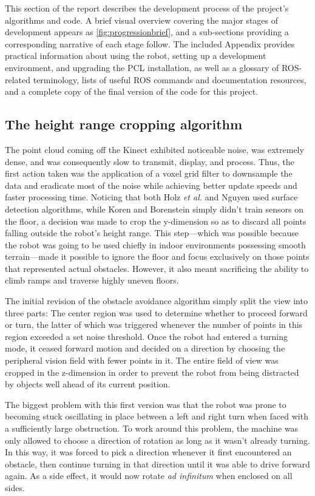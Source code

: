 \documentclass[12pt]{report}
\begin{document}
This section of the report describes the development process of the project's algorithms and code.  A brief visual overview covering the major stages of development appears as \autoref{fig:progressionbrief}, and a sub-sections providing a corresponding narrative of each stage follow.  The included Appendix provides practical information about using the robot, setting up a development environment, and upgrading the PCL installation, as well as a glossary of ROS-related terminology, lists of useful ROS commands and documentation resources, and a complete copy of the final version of the code for this project.

\subsection[Height range cropping]{The height range cropping algorithm}
The point cloud coming off the Kinect exhibited noticeable noise, was extremely dense, and was consequently slow to transmit, display, and process.  Thus, the first action taken was the application of a voxel grid filter to downsample the data and eradicate most of the noise while achieving better update speeds and faster processing time.  Noticing that both Holz \textit{et al.} and Nguyen used surface detection algorithms, while Koren and Borenstein simply didn't train sensors on the floor, a decision was made to crop the y-dimension so as to discard all points falling outside the robot's height range.  This step---which was possible because the robot was going to be used chiefly in indoor environments possessing smooth terrain---made it possible to ignore the floor and focus exclusively on those points that represented actual obstacles.  However, it also meant sacrificing the ability to climb ramps and traverse highly uneven floors.

The initial revision of the obstacle avoidance algorithm simply split the view into three parts:  The center region was used to determine whether to proceed forward or turn, the latter of which was triggered whenever the number of points in this region exceeded a set noise threshold.  Once the robot had entered a turning mode, it ceased forward motion and decided on a direction by choosing the peripheral vision field with fewer points in it.  The entire field of view was cropped in the z-dimension in order to prevent the robot from being distracted by objects well ahead of its current position.

The biggest problem with this first version was that the robot was prone to becoming stuck oscillating in place between a left and right turn when faced with a sufficiently large obstruction.  To work around this problem, the machine was only allowed to choose a direction of rotation as long as it wasn't already turning.  In this way, it was forced to pick a direction whenever it first encountered an obstacle, then continue turning in that direction until it was able to drive forward again.  As a side effect, it would now rotate \textit{ad infinitum} when enclosed on all sides.
\end{document}
